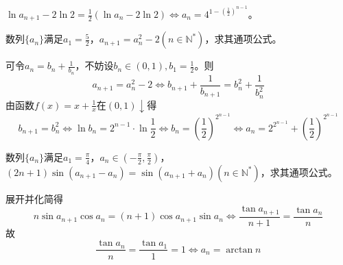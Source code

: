 \documentclass[../sample]{subfiles}
\begin{document}
$\ln a_{n+1}-2\ln 2=\frac{1}{2}(\ln a_n-2\ln 2)\Leftrightarrow a_n=4^{1-(\frac{1}{2})^{n-1}}$。

\begin{problem}
  数列$\{a_n\}$满足$a_1=\frac{5}{2}$，$a_{n+1}=a_n^2-2(n\in\mathbb{N^*})$，求其通项公式。
\end{problem}

可令$a_n=b_n+\frac{1}{b_n}$，不妨设$b_n\in (0,1), b_1=\frac{1}{2}$。则\[a_{n+1}=a_n^2-2\Leftrightarrow b_{n+1}+\frac{1}{b_{n+1}}=b_n^2+\frac{1}{b_n^2}\]
由函数$f(x)=x+\frac{1}{x}在(0, 1)\downarrow$得\[b_{n+1}=b_n^2\Leftrightarrow \ln b_n=2^{n-1}·\ln \frac{1}{2}\Leftrightarrow b_n=(\frac{1}{2})^{2^{n-1}}\Leftrightarrow a_n=2^{2^{n-1}}+(\frac{1}{2})^{2^{n-1}}\]

\begin{problem}
  数列$\{a_n\}$满足$a_1=\frac{\pi}{4}$，$a_n\in (-\frac{\pi}{2}, \frac{\pi}{2})$，$(2n+1)\sin(a_{n+1}-a_n)=\sin(a_{n+1}+a_n)(n\in\mathbb{N^*})$，求其通项公式。
\end{problem}

展开并化简得\[n\sin a_{n+1}\cos a_n=(n+1)\cos a_{n+1}\sin a_n\Leftrightarrow \frac{\tan a_{n+1}}{n+1}=\frac{\tan a_n}{n}\]
故\[\frac{\tan a_n}{n}=\frac{\tan a_1}{1}=1\Leftrightarrow a_n=\arctan n\]
\end{document}
